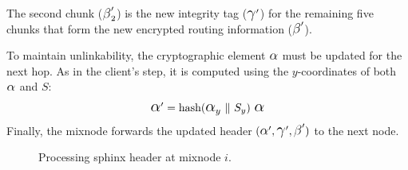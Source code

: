 \noindent The second chunk ($ \BETA'_2 $) is the new integrity tag ($ \GAMMA' $) for the remaining five chunks that form the new encrypted routing information ($ \BETA' $).

To maintain unlinkability, the cryptographic element $ \ALPHA $ must be updated for the next hop. 
As in the client's step, it is computed using the $y$-coordinates of both $ \ALPHA $ and $ S $:
\begin{equation}
\ALPHA' = \text{hash}(\ALPHA_y \ \| \ S_y) \ \ALPHA
\label{eq:update_alpha}
\end{equation}
Finally, the mixnode forwards the updated header $ (\ALPHA', \GAMMA', \BETA') $ to the next node.

\begin{figure}[H]
    \centering
    \resizebox{0.9\linewidth}{!}{}
    \caption{Processing sphinx header at mixnode $i$.}
    \label{fig:mixnode_decryption}
\end{figure}


